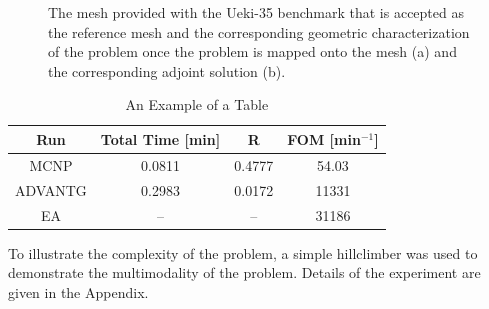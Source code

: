 \documentclass[conference]{IEEEtran}
\begin{document}
\begin{figure}[!t]
\centering
{}
\hfil
{}
\caption{The mesh provided with the Ueki-35 benchmark that is accepted as the reference mesh and the corresponding geometric characterization of the problem once the problem is mapped onto the mesh (a) and the corresponding adjoint solution (b).}
\label{fig:uekimcnp}
\end{figure}

\begin{table}[!t]
\caption{An Example of a Table}
\label{tab:results}
\centering
\begin{tabular}{|c|c|c|c|} \hline
Run & Total Time [min] & R & FOM [min$^{-1}$] \\ \hline
MCNP & 0.0811 & 0.4777 & 54.03 \\ \hline
ADVANTG & 0.2983 & 0.0172 & 11331 \\ \hline
EA & -- & -- & 31186 \\ \hline 
\end{tabular}
\end{table}

To illustrate the complexity of the problem, a simple hillclimber was used to demonstrate the multimodality of the problem. Details of the experiment are given in the Appendix.
\end{document}
